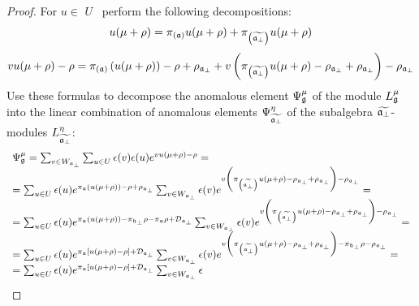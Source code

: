\documentclass[12pt]{iopart}
\theoremstyle{definition}
\theoremstyle{definition}
\theoremstyle{definition}
\theoremstyle{definition}
\begin{document}
\begin{proof}
For $u\in $ $U$ \ perform the following decompositions:
\begin{equation*}
u(\mu +\rho )=\pi _{\left( \frak{a}\right) }u(\mu +\rho )+\pi _{\left(
\widetilde{\frak{a}_{\perp }}\right) }u(\mu +\rho )
\end{equation*}
\begin{equation*}
vu(\mu +\rho )-\rho =\pi _{\left( \frak{a}\right) }\left( u(\mu +\rho
)\right) -\rho +\rho _{\frak{a}_{\perp }}+v\left( \pi _{\left( \widetilde{%
\frak{a}_{\perp }}\right) }u(\mu +\rho )-\rho _{\frak{a}_{\perp }}+\rho _{%
\frak{a}_{\perp }}\right) -\rho _{\frak{a}_{\perp }}
\end{equation*}
Use these formulas to decompose the anomalous element $\Psi _{\frak{g}}^{\mu
}$ of the module $L_{\frak{g}}^{\mu }$ into the linear combination of
anomalous elements $\Psi _{\widetilde{\frak{a}_{\perp }}}^{\eta }$ of the
subalgebra $\widetilde{\frak{a}_{\perp }}$-modules $L_{\widetilde{\frak{a}%
_{\perp }}}^{\eta }$:
\begin{equation*}
\begin{array}{l}
\Psi _{\frak{g}}^{\mu }=\sum_{v\in W_{\frak{a}_{\perp }}}\sum_{u\in
U}\epsilon (v)\epsilon (u)e^{vu(\mu +\rho )-\rho }= \\
=\sum_{u\in U}\epsilon (u)e^{\pi _{\frak{a}}\left( u(\mu +\rho )\right)
-\rho +\rho _{\frak{a}_{\perp }}}\sum_{v\in W_{\frak{a}_{\perp }}}\epsilon
(v)e^{v\left( \pi _{\left( \widetilde{\frak{a}_{\perp }}\right) }u(\mu +\rho
)-\rho _{\frak{a}_{\perp }}+\rho _{\frak{a}_{\perp }}\right) -\rho _{\frak{a}%
_{\perp }}}= \\
=\sum_{u\in U}\epsilon (u)e^{\pi _{\frak{a}}\left( u(\mu +\rho )\right) -\pi
_{\frak{h}_{\perp }}\rho -\pi _{\frak{a}}\rho +\mathcal{D}_{\frak{a}_{\perp
}}}\sum_{v\in W_{\frak{a}_{\perp }}}\epsilon (v)e^{v\left( \pi _{\left(
\widetilde{\frak{a}_{\perp }}\right) }u(\mu +\rho )-\rho _{\frak{a}_{\perp
}}+\rho _{\frak{a}_{\perp }}\right) -\rho _{\frak{a}_{\perp }}}= \\
=\sum_{u\in U}\epsilon (u)e^{\pi _{\frak{a}}\left[ u(\mu +\rho )-\rho \right]
+\mathcal{D}_{\frak{a}_{\perp }}}\sum_{v\in W_{\frak{a}_{\perp }}}\epsilon
(v)e^{v\left( \pi _{\left( \widetilde{\frak{a}_{\perp }}\right) }u(\mu +\rho
)-\rho _{\frak{a}_{\perp }}+\rho _{\frak{a}_{\perp }}\right) -\pi _{\frak{h}%
_{\perp }}\rho -\rho _{\frak{a}_{\perp }}}= \\
=\sum_{u\in U}\epsilon (u)e^{\pi _{\frak{a}}\left[ u(\mu +\rho )-\rho \right]
+\mathcal{D}_{\frak{a}_{\perp }}}\sum_{v\in W_{\frak{a}_{\perp }}}\epsilon

\end{array}
\end{equation*}
\end{proof}
\end{document}
